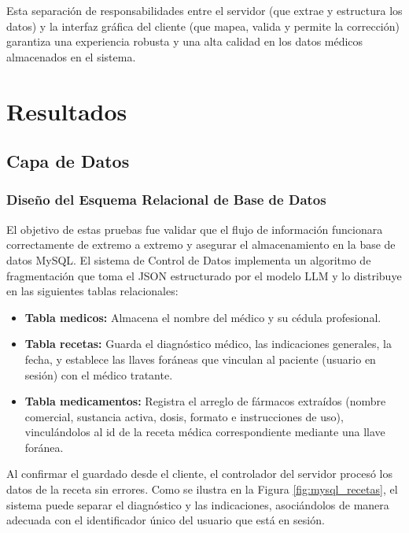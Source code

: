 Esta separación de responsabilidades entre el servidor (que extrae y estructura los datos) y la interfaz gráfica del cliente (que mapea, valida y permite la corrección) garantiza una experiencia robusta y una alta calidad en los datos médicos almacenados en el sistema.


\clearpage

\section{Resultados}
\label{sec:res}

\subsection{Capa de Datos}

\subsubsection{Diseño del Esquema Relacional de Base de Datos}
El objetivo de estas pruebas fue validar que el flujo de información funcionara correctamente de extremo a extremo y asegurar el almacenamiento en la base de datos MySQL. El sistema de Control de Datos implementa un algoritmo de fragmentación que toma el JSON estructurado por el modelo LLM y lo distribuye en las siguientes tablas relacionales:
\begin{itemize}
    \item \textbf{Tabla medicos:} Almacena el nombre del médico y su cédula profesional.
    \item \textbf{Tabla recetas:} Guarda el diagnóstico médico, las indicaciones generales, la fecha, y establece las llaves foráneas que vinculan al paciente (usuario en sesión) con el médico tratante.
    \item \textbf{Tabla medicamentos:} Registra el arreglo de fármacos extraídos (nombre comercial, sustancia activa, dosis, formato e instrucciones de uso), vinculándolos al id de la receta médica correspondiente mediante una llave foránea.
\end{itemize}

Al confirmar el guardado desde el cliente, el controlador del servidor procesó los datos de la receta sin errores. Como se ilustra en la Figura \ref{fig:mysql_recetas}, el sistema puede separar el diagnóstico y las indicaciones, asociándolos de manera adecuada con el identificador único del usuario que está en sesión.

